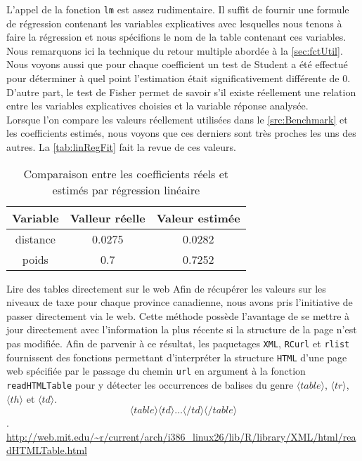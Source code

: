 \vspace{\baselineskip}
L'appel de la fonction \texttt{lm} \cite{Rfunction:lm} est assez rudimentaire. Il suffit de fournir une formule de régression contenant les variables explicatives avec lesquelles nous tenons à faire la régression et nous spécifions le nom de la table contenant ces variables. Nous remarquons ici la technique du retour multiple abordée à la \autoref{sec:fctUtil}. Nous voyons aussi que pour chaque coefficient un test de Student a été effectué pour déterminer à quel point l'estimation était significativement différente de 0. D'autre part, le test de Fisher permet de savoir s'il existe réellement une relation entre les variables explicatives choisies et la variable réponse analysée. \cite{outputLM} \\

Lorsque l'on compare les valeurs réellement utilisées dans le \autoref{src:Benchmark} et les coefficients estimés, nous voyons que ces derniers sont très proches les uns des autres. La \autoref{tab:linRegFit} fait la revue de ces valeurs. \\

\begin{table}[h]
	\centering
	\begin{tabular}{ccc}
		\textbf{Variable} & \textbf{Valleur réelle} & \textbf{Valeur estimée} \\
		\hline
		distance & 0.0275 & 0.0282 \\
		poids & 0.7 & 0.7252		
	\end{tabular}
	\caption{Comparaison entre les coefficients réels et estimés par régression linéaire}
	\label{tab:linRegFit}
\end{table}

\begin{moreInfo}{Lire des tables directement sur le web}
	Afin de récupérer les valeurs sur les niveaux de taxe pour chaque province canadienne, nous avons pris l'initiative de passer directement via le web. Cette méthode possède l'avantage de se mettre à jour directement avec l'information la plus récente si la structure de la page n'est pas modifiée. Afin de parvenir à ce résultat, les paquetages \texttt{XML}, \texttt{RCurl} et \texttt{rlist} fournissent des fonctions permettant d'interpréter la structure \texttt{HTML} d'une page web spécifiée par le passage du chemin \texttt{url} en argument à la fonction \texttt{readHTMLTable} pour y détecter les occurrences de balises du genre $\langle table \rangle$, $\langle tr \rangle$, $\langle th \rangle$ et $\langle td \rangle$.  $$\langle table \rangle \langle td \rangle \dots \langle /td \rangle \langle /table \rangle$$.
	\url{http://web.mit.edu/~r/current/arch/i386_linux26/lib/R/library/XML/html/readHTMLTable.html}
\end{moreInfo}

